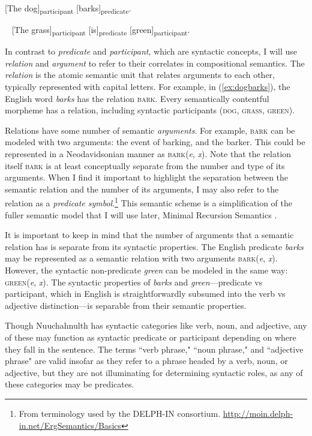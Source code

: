 \ex \label{ex:dogbarks}
[The dog]\textsubscript{participant} [barks]\textsubscript{predicate}.
\xe

\ex~ \label{ex:grassgreen}
[The grass]\textsubscript{participant} [is]\textsubscript{predicate} [green]\textsubscript{participant}.
\xe

In contrast to \textit{predicate} and \textit{participant}, which are syntactic concepts, I will use \textit{relation} and \textit{argument} to refer to their correlates in compositional semantics. The \textit{relation} is the atomic semantic unit that relates arguments to each other, typically represented with capital letters. For example, in (\ref{ex:dogbarks}), the English word \textit{barks} has the relation \textsc{bark}. Every semantically contentful morpheme has a relation, including syntactic participants (\textsc{dog}, \textsc{grass}, \textsc{green}).

Relations have some number of semantic \textit{arguments}. For example, \textsc{bark} can be modeled with two arguments: the event of barking, and the barker. This could be represented in a Neodavidsonian manner as \textsc{bark}(\textit{e}, \textit{x}). Note that the relation itself \textsc{bark} is at least conceptually separate from the number and type of its arguments. When I find it important to highlight the separation between the semantic relation and the number of its arguments, I may also refer to the relation as a \textit{predicate symbol}.\footnote{From terminology used by the DELPH-IN consortium. \url{http://moin.delph-in.net/ErgSemantics/Basics}} This semantic scheme is a simplification of the fuller semantic model that I will use later, Minimal Recursion Semantics \citep{copestake2005}.

It is important to keep in mind that the number of arguments that a semantic relation has is separate from its syntactic properties. The English predicate \textit{barks} may be represented as a semantic relation with two arguments \textsc{bark}(\textit{e}, \textit{x}). However, the syntactic non-predicate \textit{green} can be modeled in the same way: \textsc{green}(\textit{e}, \textit{x}). The syntactic properties of \textit{barks} and \textit{green}---predicate vs participant, which in English is straightforwardly subsumed into the verb vs adjective distinction---is separable from their semantic properties.

Though Nuuchahnulth has syntactic categories like verb, noun, and adjective, any of these may function as syntactic predicate or participant depending on where they fall in the sentence. The terms ``verb phrase," ``noun phrase," and ``adjective phrase" are valid insofar as they refer to a phrase headed by a verb, noun, or adjective, but they are not illuminating for determining syntactic roles, as any of these categories may be predicates.

